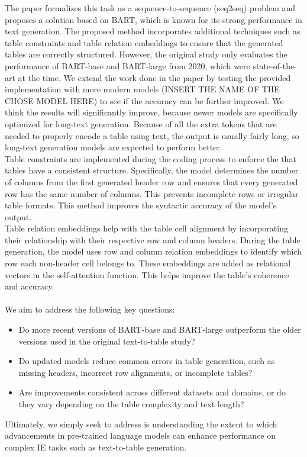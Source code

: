 \documentclass[12pt,a4paper]{article}
\begin{document}
The paper formalizes this task as a sequence-to-sequence (seq2seq) problem and proposes a solution based on BART, which is known for its strong performance in text generation. The proposed method incorporates additional techniques such as table constraints and table relation embeddings to ensure that the generated tables are correctly structured. However, the original study only evaluates the performance of BART-base and BART-large from 2020, which were state-of-the-art at the time. We extend the work done in the paper by testing the provided implementation with more modern models (INSERT THE NAME OF THE CHOSE MODEL HERE) to see if the accuracy can be further improved. We think the results will significantly improve, because newer models are specifically optimized for long-text generation. Because of all the extra tokens that are needed to properly encode a table using text, the output is usually fairly long, so long-text generation models are expected to perform better.
\ \\

Table constraints are implemented during the coding process to enforce the that tables have a consistent structure. Specifically, the model determines the number of columns from the first generated header row and ensures that every generated row has the same number of columns. This prevents incomplete rows or irregular table formats. This method improves the syntactic accuracy of the model's output.
\ \\

Table relation embeddings help with the table cell alignment by incorporating their relationship with their respective row and column headers. During the table generation, the model uses row and column relation embeddings to identify which row each non-header cell belongs to. These embeddings are added as relational vectors in the self-attention function. This helps improve the table's coherence and accuracy. 
\ \\\\
We aim to address the following key questions:
\begin{itemize}
    \item Do more recent versions of BART-base and BART-large outperform the older versions used in the original text-to-table study?

    \item Do updated models reduce common errors in table generation, such as missing headers, incorrect row alignments, or incomplete tables?

    \item Are improvements consistent across different datasets and domains, or do they vary depending on the table complexity and text length?
\end{itemize}
Ultimately, we simply seek to address is understanding the extent to which advancements in pre-trained language models can enhance performance on complex IE tasks such as text-to-table generation. 
\end{document}
